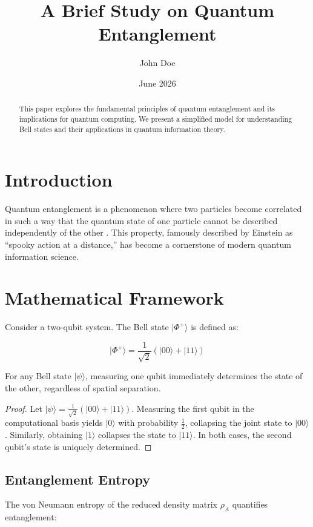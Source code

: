 \documentclass{article}
\title{A Brief Study on Quantum Entanglement}
\author{John Doe}
\date{June 2026}
\begin{document}
\maketitle

\begin{abstract}
This paper explores the fundamental principles of quantum entanglement and its implications for quantum computing. We present a simplified model for understanding Bell states and their applications in quantum information theory.
\end{abstract}

\section{Introduction}
Quantum entanglement is a phenomenon where two particles become correlated in such a way that the quantum state of one particle cannot be described independently of the other \cite{einstein1935}. This property, famously described by Einstein as ``spooky action at a distance,'' has become a cornerstone of modern quantum information science.

\section{Mathematical Framework}
Consider a two-qubit system. The Bell state $|\Phi^+\rangle$ is defined as:

$$|\Phi^+\rangle = \frac{1}{\sqrt{2}}(|00\rangle + |11\rangle)$$

\begin{theorem}
For any Bell state $|\psi\rangle$, measuring one qubit immediately determines the state of the other, regardless of spatial separation.
\end{theorem}

\begin{proof}
Let $|\psi\rangle = \frac{1}{\sqrt{2}}(|00\rangle + |11\rangle)$. Measuring the first qubit in the computational basis yields $|0\rangle$ with probability $\frac{1}{2}$, collapsing the joint state to $|00\rangle$. Similarly, obtaining $|1\rangle$ collapses the state to $|11\rangle$. In both cases, the second qubit's state is uniquely determined.
\end{proof}

\subsection{Entanglement Entropy}
The von Neumann entropy of the reduced density matrix $\rho_A$ quantifies entanglement:
\end{document}
